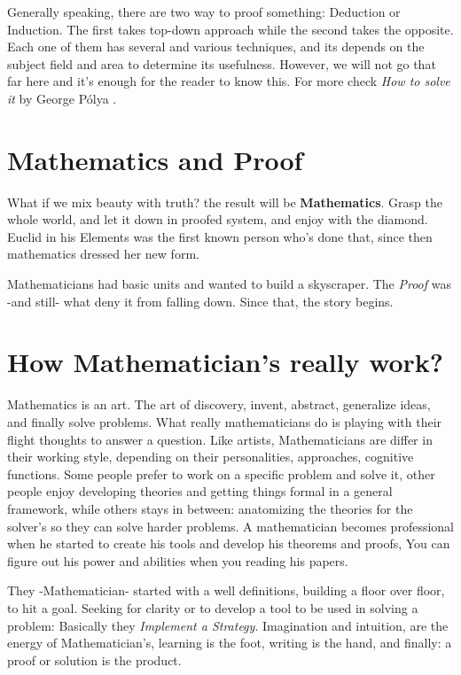 Generally speaking, there are two way to proof something: Deduction or Induction. The first takes top-down approach while the second takes the opposite. Each one of them has several and various techniques, and its depends on the subject field and area to determine its usefulness. However, we will not go that far here and it's enough for the reader to know this. For more check {\it How to solve it} by George Pólya \cite{polyasolve}.

\section{Mathematics and Proof}
What if we mix beauty with truth? the result will be {\bf Mathematics}. Grasp the whole world, and let it down in proofed system, and enjoy with the diamond. Euclid in his Elements\cite{euclid1956elements} was the first known person who's done that, since then mathematics dressed her new form.

Mathematicians had basic units and wanted to build a skyscraper. The {\it Proof} was -and still- what deny it from falling down. Since that, the story begins.

\section{How Mathematician's really work?}\label{intro.work}
Mathematics is an art. The art of discovery, invent, abstract, generalize ideas, and finally solve problems. What really mathematicians do is playing with their flight thoughts to answer a question. Like artists, Mathematicians are  differ in their working style, depending on their personalities, approaches, cognitive functions. Some people prefer to work on a specific problem and solve it, other people enjoy developing theories and getting things formal in a general framework, while others stays in between: anatomizing the theories for the solver's so they can solve harder problems. A mathematician becomes professional when he started to create his tools and develop his theorems and proofs, You can figure out his power and abilities when you reading his papers.

They -Mathematician- started with a well definitions, building a floor over floor, to hit a goal. Seeking for clarity or to develop a tool to be used in solving a problem: Basically they {\it Implement a Strategy}. Imagination and intuition, are the energy of Mathematician's, learning is the foot, writing is the hand, and finally: a proof or solution is the product.
